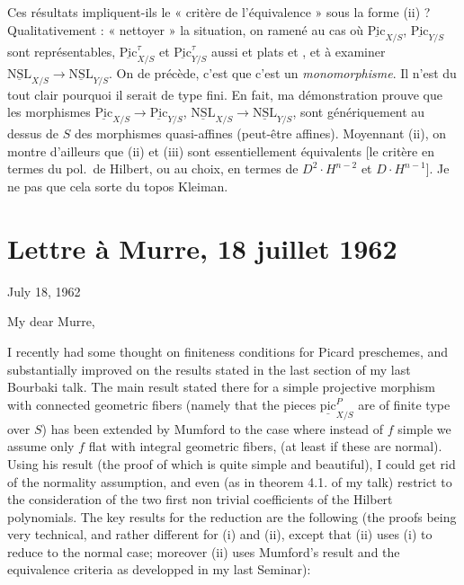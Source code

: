 \documentclass[11pt,a4paper]{article}
\begin{document}
Ces résultats impliquent-ils le « critère de l'équivalence » sous la forme (ii) ? Qualitativement : « nettoyer » la situation, on  ramené au cas où $\underline{\mathrm{Pic}}_{X/S}$, $\underline{\mathrm{Pic}}_{Y/S}$ sont représentables, $\underline{\mathrm{Pic}}^{\tau}_{X/S}$ et $\underline{\mathrm{Pic}}^{\tau}_{Y/S}$ aussi et plats et  , et à examiner $\underline{\mathrm{NSL}}_{X/S} \to \underline{\mathrm{NSL}}_{Y/S}$. On  de   précède, c'est que c'est un \emph{monomorphisme}. Il n'est  du tout clair pourquoi il serait de type fini. En fait, ma démonstration prouve que les morphismes
$\underline{\mathrm{Pic}}_{X/S} \to \underline{\mathrm{Pic}}_{Y/S}$, $\underline{\mathrm{NSL}}_{X/S} \to \underline{\mathrm{NSL}}_{Y/S}$, sont génériquement au dessus de $S$ des morphismes quasi-affines (peut-être  affines). Moyennant (ii), on montre d'ailleurs que (ii) et (iii) sont essentiellement équivalents [le critère en termes du pol.\ de Hilbert, ou au choix, en termes de $D^2\cdot H^{n-2}$ et $D\cdot H^{n-1}$]. Je ne  pas que cela sorte du topos Kleiman.

\section{Lettre à Murre, 18 juillet 1962}

July 18, 1962

My dear Murre,

I recently had some thought on finiteness conditions for Picard preschemes, and substantially improved on the results stated in the last section of my last Bourbaki talk. The main result stated there for a simple projective morphism with connected geometric fibers (namely that the pieces $\underline{\mathrm{pic}}^{P}_{X/S}$ are of finite type over $S$) has been extended by Mumford to the case where instead of $f$ simple we assume only $f$ flat with integral geometric fibers, (at least if these are normal). Using his result (the proof of which is quite simple and beautiful), I could get rid of the normality assumption, and even (as in theorem 4.1. of my talk) restrict to the consideration of the two first non trivial coefficients of the Hilbert polynomials. The key results for the reduction are the following (the proofs being very technical, and rather different for (i) and (ii), except that (ii) uses (i) to reduce to the normal case; moreover (ii) uses Mumford's result and the equivalence criteria as developped in my last Seminar):
\end{document}
